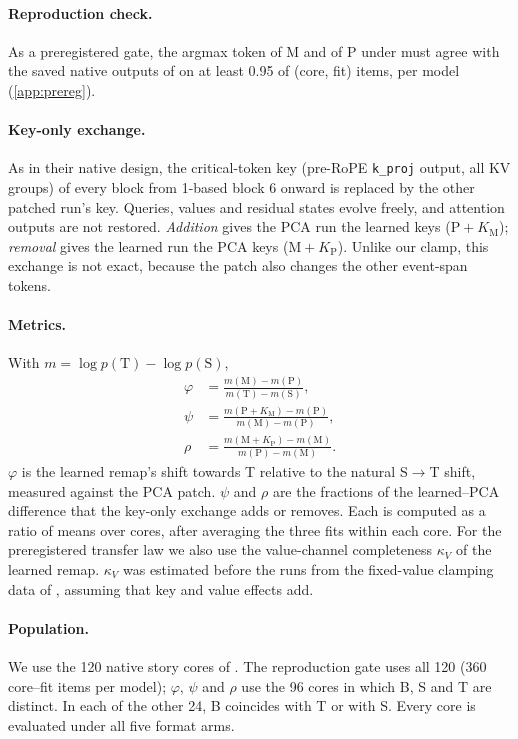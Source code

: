 \paragraph{Reproduction check.} As a preregistered gate, the argmax token of M and of P under \fmtOpt{} must agree with the saved native outputs of \citet{anonymous2026fitted} on at least 0.95 of (core, fit) items, per model (\cref{app:prereg}).

\paragraph{Key-only exchange.} As in their native design, the critical-token key (pre-RoPE \texttt{k\_proj} output, all KV groups) of every block from 1-based block 6 onward is replaced by the other patched run's key. Queries, values and residual states evolve freely, and attention outputs are not restored. \emph{Addition} gives the PCA run the learned keys ($\mathrm{P}{+}K_{\mathrm{M}}$); \emph{removal} gives the learned run the PCA keys ($\mathrm{M}{+}K_{\mathrm{P}}$). Unlike our clamp, this exchange is not exact, because the patch also changes the other event-span tokens.

\paragraph{Metrics.} With $m = \log p(\mathrm{T}) - \log p(\mathrm{S})$,
\begin{align}
\varphi &= \frac{m(\mathrm{M}) - m(\mathrm{P})}{m(\mathrm{T}) - m(\mathrm{S})}, \label{eq:phi}\\
\psi &= \frac{m(\mathrm{P}{+}K_{\mathrm{M}}) - m(\mathrm{P})}{m(\mathrm{M}) - m(\mathrm{P})}, \label{eq:psi}\\
\rho &= \frac{m(\mathrm{M}{+}K_{\mathrm{P}}) - m(\mathrm{M})}{m(\mathrm{P}) - m(\mathrm{M})}. \label{eq:rho}
\end{align}
$\varphi$ is the learned remap's shift towards T relative to the natural S$\to$T shift, measured against the PCA patch. $\psi$ and $\rho$ are the fractions of the learned--PCA difference that the key-only exchange adds or removes. Each is computed as a ratio of means over cores, after averaging the three fits within each core.
For the preregistered transfer law we also use the value-channel completeness $\kappa_V$ of the learned remap. $\kappa_V$ was estimated before the runs from the fixed-value clamping data of \citet{anonymous2026fitted}, assuming that key and value effects add.

\paragraph{Population.} We use the 120 native story cores of \citet{anonymous2026fitted}. The reproduction gate uses all 120 (360 core--fit items per model); $\varphi$, $\psi$ and $\rho$ use the 96 cores in which B, S and T are distinct. In each of the other 24, B coincides with T or with S. Every core is evaluated under all five format arms.

